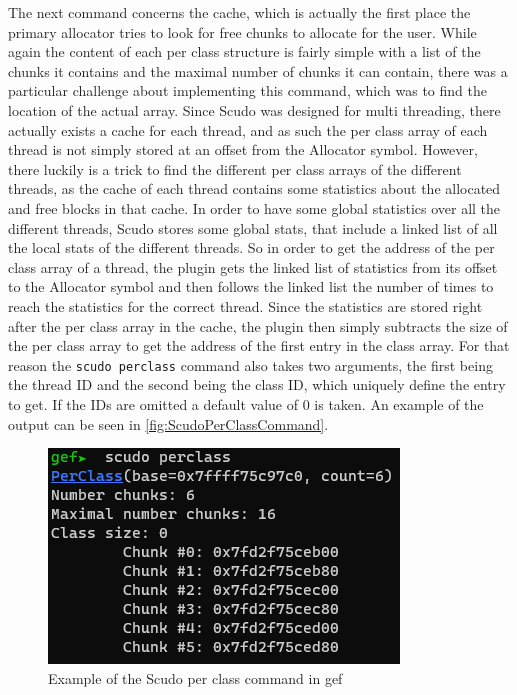 \documentclass[a4paper,11pt,oneside]{report}
\begin{document}
The next command concerns the cache, which is actually the first place the
primary allocator tries to look for free chunks to allocate for the user.
While again the content of each per class structure is fairly simple with a
list of the chunks it contains and the maximal number of chunks it can contain,
there was a particular challenge about implementing this command, which was to
find the location of the actual array. Since Scudo was designed for multi
threading, there actually exists a cache for each thread, and as such the per
class array of each thread is not simply stored at an offset from the Allocator
symbol. However, there luckily is a trick to find the different per class arrays
of the different threads, as the cache of each thread contains some statistics
about the allocated and free blocks in that cache. In order to have some global
statistics over all the different threads, Scudo stores some global stats, that
include a linked list of all the local stats of the different threads. So in
order to get the address of the per class array of a thread, the plugin gets
the linked list of statistics from its offset to the Allocator symbol and then
follows the linked list the number of times to reach the statistics for the
correct thread. Since the statistics are stored right after the per class array
in the cache, the plugin then simply subtracts the size of the per class array
to get the address of the first entry in the class array.
For that reason the \verb|scudo perclass| command also takes two arguments, the first
being the thread ID and the second being the class ID, which uniquely define
the entry to get. If the IDs are omitted a default value of 0 is taken. An
example of the output can be seen in \autoref{fig:ScudoPerClassCommand}.

\begin{figure}[h!]
  \centering
  \includegraphics{figures/ScudoPerClassCommand.png}
  \caption{Example of the Scudo per class command in gef}
  \label{fig:ScudoPerClassCommand}
\end{figure}
\end{document}
